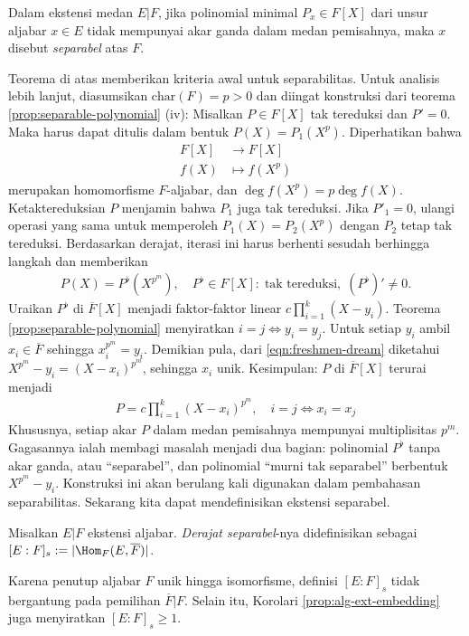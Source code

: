 \begin{definition}
	Dalam ekstensi medan $E|F$, jika polinomial minimal $P_x \in F[X]$ dari unsur aljabar $x \in E$ tidak mempunyai akar ganda dalam medan pemisahnya, maka $x$ disebut \emph{separabel} atas $F$.
\end{definition}

Teorema di atas memberikan kriteria awal untuk separabilitas. Untuk analisis lebih lanjut, diasumsikan $\text{char}(F)=p > 0$ dan diingat konstruksi dari teorema \ref{prop:separable-polynomial} (iv): Misalkan $P \in F[X]$ tak tereduksi dan $P'=0$. Maka harus dapat ditulis dalam bentuk $P(X) = P_1(X^p)$. Diperhatikan bahwa
\begin{align*}
	F[X] & \longrightarrow F[X] \\
	f(X) & \longmapsto f(X^p)
\end{align*}
merupakan homomorfisme $F$-aljabar, dan $\deg f(X^p) = p \deg f(X)$. Ketaktereduksian $P$ menjamin bahwa $P_1$ juga tak tereduksi. Jika $P'_1 = 0$, ulangi operasi yang sama untuk memperoleh $P_1(X) = P_2(X^p)$ dengan $P_2$ tetap tak tereduksi. Berdasarkan derajat, iterasi ini harus berhenti sesudah berhingga langkah dan memberikan
\begin{gather}\label{eqn:P-to-P-flat}
	P(X) = P^\flat\left( X^{p^m} \right), \quad P^\flat \in F[X]:\; \text{tak tereduksi}, \; (P^\flat)' \neq 0.
\end{gather}
Uraikan $P^\flat$ di $\overline{F}[X]$ menjadi faktor-faktor linear $c \prod_{i=1}^k (X - y_i)$. Teorema \ref{prop:separable-polynomial} menyiratkan $i = j \iff y_i=y_j$. Untuk setiap $y_i$ ambil $x_i \in \overline{F}$ sehingga $x_i^{p^m} = y_i$. Demikian pula, dari \eqref{eqn:freshmen-dream} diketahui $X^{p^m} - y_i = (X - x_i)^{p^m}$, sehingga $x_i$ unik. Kesimpulan: $P$ di $\overline{F}[X]$ terurai menjadi
\begin{gather*}
	P = c \prod_{i=1}^k (X - x_i)^{p^m}, \quad i=j \iff x_i = x_j
\end{gather*}
Khususnya, setiap akar $P$ dalam medan pemisahnya mempunyai multiplisitas $p^m$. Gagasannya ialah membagi masalah menjadi dua bagian: polinomial $P^\flat$ tanpa akar ganda, atau ``separabel'', dan polinomial ``murni tak separabel'' berbentuk $X^{p^m} - y_i$. Konstruksi ini akan berulang kali digunakan dalam pembahasan separabilitas. Sekarang kita dapat mendefinisikan ekstensi separabel.

\begin{definition}
	Misalkan $E|F$ ekstensi aljabar. \emph{Derajat separabel}-nya didefinisikan sebagai $[E:F]_s := |\Hom_F(E, \overline{F})|$.
\end{definition}
Karena penutup aljabar $F$ unik hingga isomorfisme, definisi $[E:F]_s$ tidak bergantung pada pemilihan $\overline{F}|F$. Selain itu, Korolari \ref{prop:alg-ext-embedding} juga menyiratkan $[E:F]_s \geq 1$.

